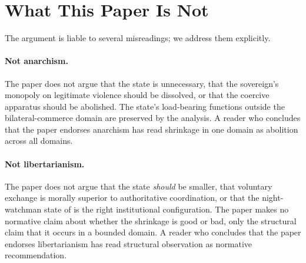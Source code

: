 \documentclass[11pt,a4paper]{article}
\theoremstyle{remark}
\begin{document}
\section{What This Paper Is Not}
\label{sec:not}

The argument is liable to several misreadings; we address them
explicitly.

\paragraph{Not anarchism.}
The paper does not argue that the state is unnecessary, that the
sovereign's monopoly on legitimate violence should be dissolved,
or that the coercive apparatus should be abolished. The state's
load-bearing functions outside the bilateral-commerce domain are
preserved by the analysis. A reader who concludes that the paper
endorses anarchism has read shrinkage in one domain as
abolition across all domains.

\paragraph{Not libertarianism.}
The paper does not argue that the state \emph{should} be
smaller, that voluntary exchange is morally superior to
authoritative coordination, or that the night-watchman state of
\citet{nozick1974anarchy} is the right institutional
configuration. The paper makes no normative claim about whether
the shrinkage is good or bad, only the structural claim that it
occurs in a bounded domain. A reader who concludes that the paper
endorses libertarianism has read structural observation as
normative recommendation.
\end{document}
